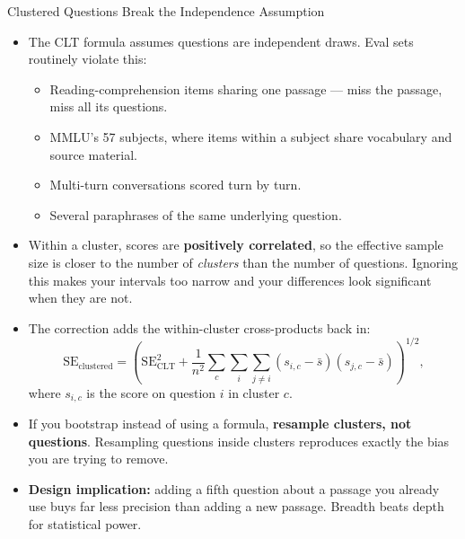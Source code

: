 \begin{frame}[allowframebreaks]{Clustered Questions Break the Independence Assumption}
  \begin{itemize}\footnotesize\itemsep0.32em
    \item[\textcolor{red}{$\blacktriangleright$}] The CLT formula assumes questions are independent draws. Eval sets routinely violate this:
      \begin{itemize}\itemsep0.12em
        \item Reading-comprehension items sharing one passage --- miss the passage, miss all its questions.
        \item MMLU's 57 subjects, where items within a subject share vocabulary and source material.
        \item Multi-turn conversations scored turn by turn.
        \item Several paraphrases of the same underlying question.
      \end{itemize}
    \item[\textcolor{red}{$\blacktriangleright$}] Within a cluster, scores are \textbf{positively correlated}, so the effective sample size is closer to the number of \textit{clusters} than the number of questions. Ignoring this makes your intervals too narrow and your differences look significant when they are not.
    \item[\textcolor{red}{$\blacktriangleright$}] The correction adds the within-cluster cross-products back in:
      \[
        \mathrm{SE}_{\text{clustered}} = \left(\mathrm{SE}_{\mathrm{CLT}}^{2}
          + \frac{1}{n^{2}}\sum_{c}\sum_{i}\sum_{j \neq i}
            \left(s_{i,c} - \bar{s}\right)\left(s_{j,c} - \bar{s}\right)\right)^{1/2},
      \]
      where $s_{i,c}$ is the score on question $i$ in cluster $c$.
    \item[\textcolor{red}{$\blacktriangleright$}] If you bootstrap instead of using a formula, \textbf{resample clusters, not questions}. Resampling questions inside clusters reproduces exactly the bias you are trying to remove.
    \item[\textcolor{red}{$\blacktriangleright$}] \textbf{Design implication:} adding a fifth question about a passage you already use buys far less precision than adding a new passage. Breadth beats depth for statistical power.
  \end{itemize}
\end{frame}

